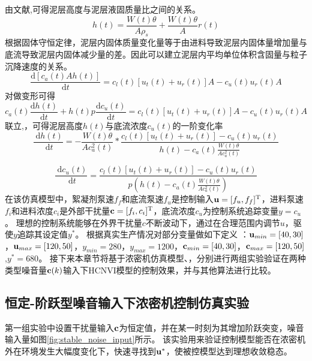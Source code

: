 由文献\cite{Tang2009},可得泥层高度与泥层液固质量比之间的关系。
 \begin{equation}
 \label{equ:H_ca}
h(t)=\frac{W(t) \theta}{A \rho_{s}}+\frac{W(t) \theta}{A}r(t)
\end{equation}
根据固体守恒定律，泥层内固体质量变化量等于由进料导致泥层内固体量增加量与底流导致泥层内固体减少量的差。因此可以建立泥层内平均单位体积含固量与粒子沉降速度的关系。
\begin{equation}
\label{equ:mass_balance} \frac{\mathrm{d}\left[c_{a}(t) A
h(t)\right]}{\mathrm{d} t}=c_{l}(t)\left[u_{t}(t)+u_{r}(t)\right]
A-c_{u}(t) u_{r}(t) A
\end{equation}
对做变形可得
\begin{equation}
\label{equ:mass_thickener_formula}
c_{a}(t) \frac{\mathrm{d} h(t)}{\mathrm{d} t}+h(t) p
\frac{\mathrm{d} c_{u}(t)}{\mathrm{d} t}=
c_{l}(t)\left[u_{t}(t)+u_{r}(t)\right] A -c_{u}(t) u_{r}(t) A
\end{equation}
联立,，可得泥层高度$h(t)$与底流浓度$c_u(t)$的一阶变化率
\begin{equation}
\label{equ:dh_dt} \frac{\mathrm{~d} h(t)}{\mathrm{~d} t}=-\frac{W(t) \theta}{A
c_{a}^{2}(t)}*\frac{ c_{l}(t)\left[u_{t}(t)+u_{r}(t)\right]-c_{u}(t)
u_{r}(t)}{h(t)-c_{a}(t) \frac{W(t) \theta}{A c_{a}^{2}(t)}}
\end{equation}

\begin{equation}
\label{equ:du_dt} \frac{\mathrm{~d} c_{u}(t)}{\mathrm{~d}
t}=\frac{c_{l}(t)\left[u_{t}(t)+u_{r}(t)\right]-c_{u}(t)
u_{r}(t)}{p(h(t)-c_{a}(t) \frac{W(t) \theta}{A c_{a}^{2}(t)})}
\end{equation}
在该仿真模型中，絮凝剂泵速$f_f$和底流泵速$f_u$是控制输入$\mathbf
u=[f_u,f_f]^{\rm T}$，进料泵速$f_i$和进料浓度$c_i$是外部干扰量$\mathbf
c=[f_i,c_i]^{\rm T}$，底流浓度$c_u$为控制系统追踪变量$y=c_u$。
理想的控制系统能够在外界干扰量$c$不断波动下，通过在合理范围内调节$u$，驱使$y$追踪其设定值$y^*$。
根据真实生产情况对部分变量做如下定义 ：$\mathbf u_{min}=[40,30]$，$\mathbf
u_{max}=[120,50]$，$y_{min}=280$，$y_{max}=1200$，$\mathbf
c_{min}=[40,30]$，$\mathbf c_{max}=[120,50]$,$y^*=680$。
接下来本章节将基于浓密机仿真模型、，分别进行两组实验验证在两种类型噪音量$\mathbf
c(k)$输入下HCNVI模型的控制效果，并与其他算法进行比较。
\subsection{恒定-阶跃型噪音输入下浓密机控制仿真实验}
\label{sec:vi_hdp_stable} 第一组实验中设置干扰量输入$\mathbf
c$为恒定值，并在某一时刻为其增加阶跃突变，噪音输入量如图\ref{fig:stable_noise_input}所示。
该实验用来验证控制模型能否在浓密机外在环境发生大幅度变化下，快速寻找到$\mathbf
u^*$，使被控模型达到理想收敛稳态。

